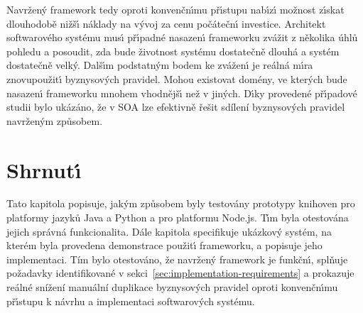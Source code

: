Navržen\'y framework tedy oproti konvenčn\'{\i}mu př\'{\i}stupu nab\'{\i}z\'{\i} možnost z\'{\i}skat dlouhodobě
nižš\'{\i} náklady na v\'yvoj za cenu počátečn\'{\i} investice. Architekt softwarového systému mus\'{\i} př\'{\i}padné nasazen\'{\i}
frameworku zvážit z několika úhlů pohledu a posoudit, zda bude životnost systému dostatečně dlouhá a systém
dostatečně velk\'y. Dalš\'{\i}m podstatn\'ym bodem ke zvážen\'{\i} je reálná m\'{\i}ra znovupoužit\'{\i} byznysov\'ych pravidel.
Mohou existovat domény, ve kter\'ych bude nasazen\'{\i} frameworku mnohem vhodnějš\'{\i} než v jin\'ych.
D\'{\i}ky provedené př\'{\i}padové studii bylo ukázáno, že v \gls{SOA} lze efektivně řešit sdílení byznysov\'ych pravidel
navržen\'ym způsobem.

\section{Shrnut\'{\i}}

Tato kapitola popisuje, jak\'ym způsobem byly testovány prototypy knihoven
pro platformy jazyků Java a Python a pro platformu Node.js. T\'{\i}m byla otestována
jejich správná funkcionalita. Dále kapitola specifikuje ukázkový systém, na kterém byla
provedena demonstrace použit\'{\i} frameworku, a popisuje jeho implementaci.
Tím bylo otestováno, že navržen\'y framework je funkčn\'{\i},
splňuje požadavky identifikované v sekci~\ref{sec:implementation-requirements}
a prokazuje reálné snížení manuální duplikace byznysových pravidel oproti
konvenčn\'{\i}mu př\'{\i}stupu k návrhu a implementaci softwarov\'ych systému.
